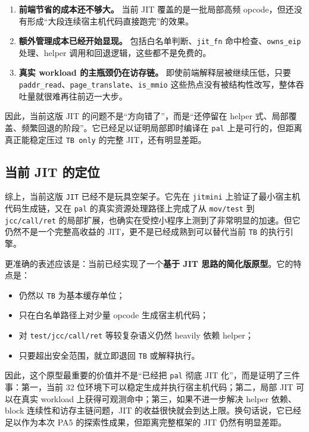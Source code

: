 \documentclass[a4paper]{article}
\begin{document}
\begin{enumerate}
  \item \textbf{前端节省的成本还不够大。} 当前 JIT 覆盖的是一批局部高频 opcode，但还没有形成“大段连续宿主机代码直接跑完”的效果。
  \item \textbf{额外管理成本已经开始显现。} 包括白名单判断、\texttt{jit\_fn} 命中检查、\texttt{owns\_eip} 处理、helper 调用和回退逻辑，这些都不是免费的。
  \item \textbf{真实 workload 的主瓶颈仍在访存链。} 即使前端解释层被继续压低，只要 \texttt{paddr\_read}、\texttt{page\_translate}、\texttt{is\_mmio} 这些热点没有被结构性改写，整体吞吐量就很难再往前迈一大步。
\end{enumerate}

因此，当前这版 JIT 的问题不是“方向错了”，而是“还停留在 helper 式、局部覆盖、频繁回退的阶段”。它已经足以证明局部即时编译在 \texttt{pal} 上是可行的，但距离真正能稳定压过 \texttt{TB only} 的完整 JIT，还有明显差距。

\subsection{当前 JIT 的定位}
综上，当前这版 \texttt{JIT} 已经不是玩具空架子。它先在 \texttt{jitmini} 上验证了最小宿主机代码生成链，又在 \texttt{pal} 的真实资源处理路径上完成了从 \texttt{mov/test} 到 \texttt{jcc/call/ret} 的局部扩展，也确实在受控小程序上测到了非常明显的加速。但它仍然不是一个完整高收益的 JIT，更不是已经成熟到可以替代当前 \texttt{TB} 的执行引擎。

更准确的表述应该是：当前已经实现了一个\textbf{基于 JIT 思路的简化版原型}。它的特点是：

\begin{itemize}
  \item 仍然以 \texttt{TB} 为基本缓存单位；
  \item 只在白名单路径上对少量 opcode 生成宿主机代码；
  \item 对 \texttt{test/jcc/call/ret} 等较复杂语义仍然 heavily 依赖 helper；
  \item 只要超出安全范围，就立即退回 \texttt{TB} 或解释执行。
\end{itemize}

因此，这个原型最重要的价值并不是“已经把 \texttt{pal} 彻底 JIT 化”，而是证明了三件事：第一，当前 32 位环境下可以稳定生成并执行宿主机代码；第二，局部 JIT 可以在真实 workload 上获得可观测命中；第三，如果不进一步解决 helper 依赖、block 连续性和访存主链问题，JIT 的收益很快就会到达上限。换句话说，它已经足以作为本次 PA5 的探索性成果，但距离完整框架的 JIT 仍然有明显差距。
\end{document}
